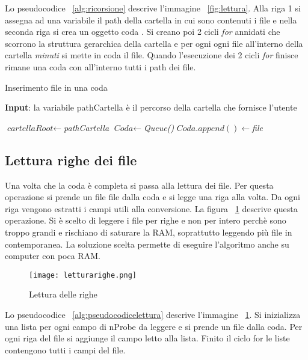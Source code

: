 \documentclass[../main.tex]{subfiles}
\begin{document}
Lo pseudocodice ~\ref{alg:ricorsione} descrive l'immagine ~\ref{fig:lettura}. Alla riga 1 si assegna ad una variabile il path della cartella in cui sono contenuti i file e nella seconda riga si crea un oggetto coda \cite{queuedef}. Si creano poi 2 cicli \textit{for} annidati che scorrono la struttura gerarchica della cartella e per ogni ogni file all'interno della cartella \textit{minuti} si mette in coda il file. Quando l'esecuzione dei 2 cicli \textit{for} finisce rimane una coda con all'interno tutti i path dei file.
\begin{algorithm}
\caption{Inserimento file in una coda}
				\label{alg:ricorsione}
				\hspace*{\algorithmicindent} \textbf{Input}: la variabile pathCartella è il percorso della cartella che fornisce l'utente \\
\begin{algorithmic}[1]
				\State $\textit{cartellaRoot} \gets $\textit{pathCartella}
				\State $\textit{Coda} \gets $\textit{Queue()} 
						\State $\textit{Coda}.append() \gets $\textit{file} 
						\EndFor
				\EndFor
\end{algorithmic}
\end{algorithm}

\subsection{Lettura righe dei file} 
Una volta che la coda è completa si passa alla lettura dei file. Per questa operazione si prende un file file dalla coda e si legge una riga alla volta. Da ogni riga vengono estratti i campi utili alla conversione.
La figura ~\ref{fig:letturarighe} descrive questa operazione. Si è scelto di leggere i file per righe e non per intero perchè sono troppo grandi e rischiano di saturare la RAM, soprattutto leggendo più file in contemporanea. La soluzione scelta permette di eseguire l'algoritmo anche su computer con poca RAM.

\begin{figure}[H]
				\centering
\texttt{[image: letturarighe.png]}
				\caption{Lettura delle righe}
				\label{fig:letturarighe}
\end{figure}


Lo pseudocodice ~\ref{alg:pseudocodicelettura} descrive l'immagine ~\ref{fig:letturarighe}. Si inizializza una lista per ogni campo di nProbe da leggere e si prende un file dalla coda. Per ogni riga del file si aggiunge il campo letto alla lista. Finito il ciclo for le liste contengono tutti i campi del file.
\end{document}
